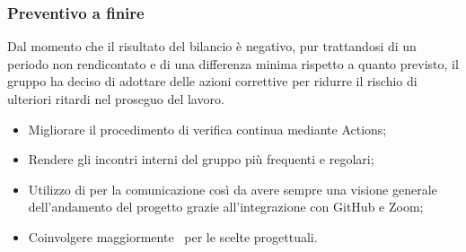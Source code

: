 \subsubsection{Preventivo a finire}
Dal momento che il risultato del bilancio è negativo, pur trattandosi di un periodo non rendicontato e di una differenza minima rispetto a quanto previsto, il gruppo {\Gruppo} ha deciso di adottare delle azioni correttive per ridurre il rischio di ulteriori ritardi nel proseguo del lavoro.
\begin{itemize}
	\item Migliorare il procedimento di verifica continua mediante  Actions;
	\item Rendere gli incontri interni del gruppo più frequenti e regolari;
	\item Utilizzo di  per la comunicazione così da avere sempre una visione generale dell'andamento del progetto grazie all'integrazione con GitHub e Zoom;
	\item Coinvolgere maggiormente \Proponente\ per le scelte progettuali.
\end{itemize}